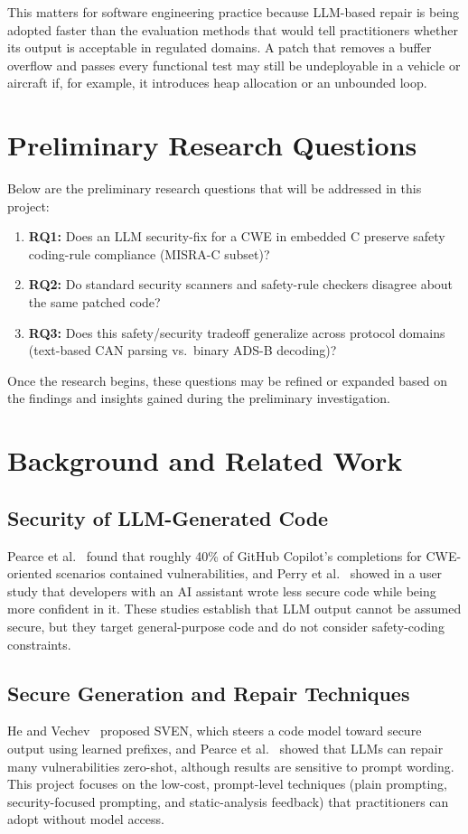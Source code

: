 \documentclass[12pt]{article}
\begin{document}
This matters for software engineering practice because LLM-based repair is being adopted faster than the evaluation methods that would tell practitioners whether its output is acceptable in regulated domains. A patch that removes a buffer overflow and passes every functional test may still be undeployable in a vehicle or aircraft if, for example, it introduces heap allocation or an unbounded loop.

\section{Preliminary Research Questions}
\label{sec:rqs}
Below are the preliminary research questions that will be addressed in this project:
\begin{enumerate}
    \item \textbf{RQ1:} Does an LLM security-fix for a CWE in embedded C preserve safety coding-rule compliance (MISRA-C subset)?
    \item \textbf{RQ2:} Do standard security scanners and safety-rule checkers disagree about the same patched code?
    \item \textbf{RQ3:} Does this safety/security tradeoff generalize across protocol domains (text-based CAN parsing vs.\ binary ADS-B decoding)?
\end{enumerate}
Once the research begins, these questions may be refined or expanded based on the findings and insights gained during the preliminary investigation.

\section{Background and Related Work}

\subsection{Security of LLM-Generated Code}
Pearce et al.~\citep{pearce2022asleep} found that roughly 40\% of GitHub Copilot's completions for CWE-oriented scenarios contained vulnerabilities, and Perry et al.~\citep{perry2023users} showed in a user study that developers with an AI assistant wrote less secure code while being more confident in it. These studies establish that LLM output cannot be assumed secure, but they target general-purpose code and do not consider safety-coding constraints.

\subsection{Secure Generation and Repair Techniques}
He and Vechev~\citep{he2023sven} proposed SVEN, which steers a code model toward secure output using learned prefixes, and Pearce et al.~\citep{pearce2023zeroshot} showed that LLMs can repair many vulnerabilities zero-shot, although results are sensitive to prompt wording. This project focuses on the low-cost, prompt-level techniques (plain prompting, security-focused prompting, and static-analysis feedback) that practitioners can adopt without model access.
\end{document}
